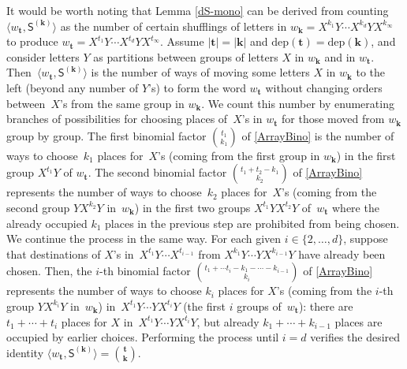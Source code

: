 \documentclass[ALCO,Unicode,published]{cedram}
\def\bk{{\mathbf{k}}}
\def\SS{{\mathsf{S}}}
\def\dep{\mathrm{dep}}
\def\bt{{\mathbf{t}}}
\def\la{\langle}
\def\ra{\rangle}
\begin{document}
\begin{Remark}
It would be worth noting that 
Lemma \ref{dS-mono} 
can be derived from
counting~$\la w_{\bt}, \SS^{(\bk)} \ra$ 
as the number of certain shufflings of letters in
$w_\bk=X^{k_1}Y\cdots X^{k_d}YX^{k_\infty}$
to produce 
$w_\bt=X^{t_1}Y\cdots X^{t_d}YX^{t_\infty}$.
Assume 
$|\bt|=|\bk|$ and $\dep(\bt)=\dep(\bk)$,
and consider letters $Y$ as partitions between 
groups of letters $X$ in $w_\bk$ and in $w_\bt$. 
Then~$\la w_{\bt}, \SS^{(\bk)} \ra$ is the number of ways
of moving some letters $X$ in $w_\bk$
to the left (beyond any number of $Y$'s)
to form the word $w_\bt$
without changing orders between~$X$'s from the same group
in $w_\bk$.
We count this number 
by enumerating branches of possibilities
for choosing
places of~$X$'s in $w_\bt$ for those moved from 
$w_\bk$ group by group. 
The first binomial factor $\binom{t_1}{k_1}$
of \eqref{ArrayBino} is the number of ways to choose~$k_1$ places for~$X$'s (coming from 
the first group in $w_\bk$) in the first group $X^{t_1}Y$ of $w_\bt$.
The second binomial factor $\binom{t_1+t_2-k_1}{k_2}$ of \eqref{ArrayBino} 
represents the number of ways to choose~$k_2$ 
places for~$X$'s (coming from the second group $YX^{k_2}Y$ in~$w_\bk$)
 in the first two groups $X^{t_1}YX^{t_2}Y$ of~$w_\bt$ 
where the already occupied $k_1$ places in the previous step
are prohibited from being chosen.
We continue the process in the same way. For each given 
$i\in\{2,\dots,d\}$, suppose that destinations of $X$'s 
in~$X^{t_1}Y\cdots X^{t_{i-1}}$ 
from $X^{k_1}Y\cdots YX^{k_{i-1}}Y$ have already been
chosen. Then, the $i$-th binomial
factor $\binom{t_1+\cdots t_i-k_1-\cdots-k_{i-1}}{k_i}$ 
of \eqref{ArrayBino}
represents the number of ways to choose $k_i$ places for 
$X$'s (coming from the $i$-th group $YX^{k_i}Y$ in~$w_\bk$)
in~$X^{t_1}Y\cdots YX^{t_i}Y$ (the first $i$ groups of~$w_\bt$):
there are $t_1+\cdots+t_i$ places for $X$ in~$X^{t_1}Y\cdots YX^{t_i}Y$,
but already $k_1+\cdots+k_{i-1}$ places are occupied 
by earlier choices.
Performing the process until $i=d$ 
verifies the desired identity
$\la w_\bt, \SS^{(\bk)} \ra=\binom{\bt}{\bk}$.
\end{Remark}
\end{document}
